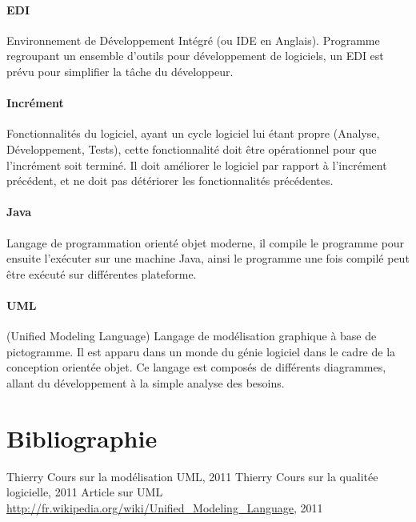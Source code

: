 \documentclass[12pt,a4paper,openany]{article}
\begin{document}
	\paragraph{EDI} Environnement de Développement Intégré (ou IDE en Anglais). Programme regroupant un ensemble d'outils pour développement de logiciels, un EDI
	est prévu pour simplifier la tâche du développeur.
	\paragraph{Incrément} Fonctionnalités du logiciel, ayant un cycle logiciel lui étant propre (Analyse, Développement, Tests), cette 
	fonctionnalité doit être opérationnel pour que l'incrément soit terminé.  Il doit améliorer le logiciel par rapport à l'incrément précédent, 
	et ne doit pas détériorer les fonctionnalités précédentes.
	\paragraph{Java} Langage de programmation orienté objet moderne, il compile le programme pour ensuite l'exécuter sur une machine Java, ainsi le programme une fois
	compilé peut être exécuté sur différentes plateforme.
	\paragraph{UML} (Unified Modeling Language) Langage de modélisation graphique à base de pictogramme. Il est apparu dans un monde du génie logiciel dans le cadre de la conception orientée objet. Ce langage est composés de différents diagrammes, allant du développement à la simple analyse des besoins. 
\section{Bibliographie}
\begin{thebibliography}{1}
	 Thierry  Cours sur la modélisation UML, 2011 
	 Thierry  Cours sur la qualitée logicielle, 2011 
	 Article sur UML \url{http://fr.wikipedia.org/wiki/Unified_Modeling_Language}, 2011 
\end{thebibliography}
\end{document}
